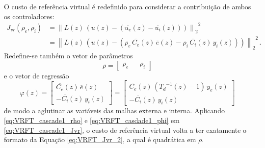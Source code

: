 \documentclass[repeatfields,oneside]{tcc}
\newcommand{\mycdot}{ \, }
\newcommand{\myC}[2][]{ C_{#1} \left( #2 \right) }
\newcommand{\myoC}[2][]{ \overline{C_{#1}} \left( #2 \right) }
\newcommand{\myCzrho}[1]{ \myC[#1]{z, \rho_{#1}} }
\begin{document}
\newpage
O custo de referência virtual é redefinido para considerar a contribuição de ambos os controladores:
\begin{equation}\label{eq:VRFT_cascade1_Jvr}
\begin{aligned}
    J_{vr} \left( \rho_e, \rho_i \right)
    &= {\left\lVert L(z) \mycdot \left( u(z) - \left( \overline{u_e}(z) - \overline{u_i}(z) \right) \right) \right\rVert_2}^2\\
    &= {\left\lVert L(z) \mycdot \left( u(z) - \left( \rho_e \mycdot \myoC[e]{z} \mycdot \overline{e}(z) - \rho_i \mycdot \myoC[i]{z} \mycdot y_i(z) \right) \right) \right\rVert_2}^2
    \,.
\end{aligned}
\end{equation}
Redefine-se também o vetor de parâmetros
\begin{equation}\label{eq:VRFT_cascade1_rho}
    \rho = \begin{bmatrix} \rho_e && \rho_i \end{bmatrix}
\end{equation}
e o vetor de regressão
\begin{equation}\label{eq:VRFT_casdade1_phi}
    \varphi(z)
    =
    \begin{bmatrix}
        \myoC[e]{z} \mycdot \overline{e}(z)
        \\
        - \myoC[i]{z} \mycdot y_i(z)
    \end{bmatrix}
    =
    \begin{bmatrix}
        \myoC[e]{z} \mycdot \left( {T_d}^{-1}(z) - 1 \right) \mycdot y_e(z)
        \\
        - \myoC[i]{z} \mycdot y_i(z)
    \end{bmatrix}
\end{equation}
de modo a aglutinar as variáveis das malhas externa e interna.
Aplicando \eqref{eq:VRFT_cascade1_rho} e \eqref{eq:VRFT_casdade1_phi} em \eqref{eq:VRFT_cascade1_Jvr}, o custo de referência virtual volta a ter exatamente o formato da Equação \eqref{eq:VRFT_Jvr_2}, a qual é quadrática em $\rho$.
\end{document}
